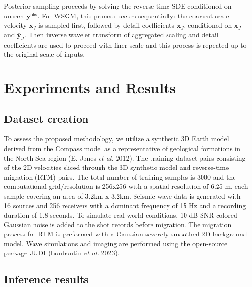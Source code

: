 \documentclass{IMAGE2025}
\begin{document}
Posterior sampling proceeds by solving the reverse-time SDE conditioned
on unseen \(\mathbf{y}^{\text{obs}}\). For WSGM, this process occurs
sequentially: the coarsest-scale velocity \(\mathbf{x}_J\) is sampled
first, followed by detail coefficients \(\overline{\mathbf{x}}_J\),
conditioned on \(\mathbf{x}_J\) and \(\overline{\mathbf{y}}_J\). Then
inverse wavelet transform of aggregated scaling and detail coefficients
are used to proceed with finer scale and this process is repeated up to
the original scale of inputs.

\section{Experiments and Results}\label{experiments-and-results}

\subsection{Dataset creation}\label{dataset-creation}

To assess the proposed methodology, we utilize a synthetic 3D Earth
model derived from the Compass model as a representative of geological
formations in the North Sea region (E. Jones \emph{et al.} 2012). The
training dataset pairs consisting of the 2D velocities sliced through
the 3D synthetic model and reverse-time migration (RTM) pairs. The total
number of training samples is 3000 and the computational grid/resolution
is 256x256 with a spatial resolution of 6.25 m, each sample covering an
area of 3.2km x 3.2km. Seismic wave data is generated with 16 sources
and 256 receivers with a dominant frequency of 15 Hz and a recording
duration of 1.8 seconds. To simulate real-world conditions, 10 dB SNR
colored Gaussian noise is added to the shot records before migration.
The migration process for RTM is preformed with a Gaussian severely
smoothed 2D background model. Wave simulations and imaging are performed
using the open-source package JUDI (Louboutin \emph{et al.} 2023).

\subsection{Inference results}\label{inference-results}
\end{document}
